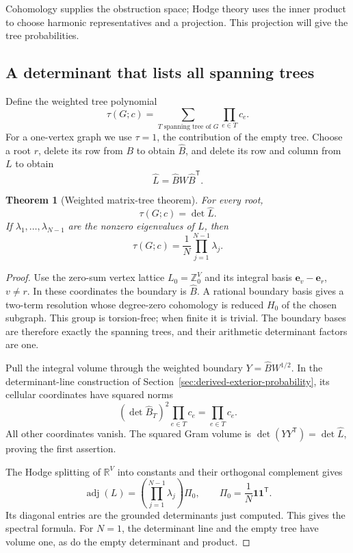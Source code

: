 \documentclass[11pt]{article}
\newtheorem{theorem}{Theorem}[section]
\theoremstyle{definition}
\theoremstyle{remark}
\newcommand{\Z}{\mathbb Z}
\newcommand{\R}{\mathbb R}
\begin{document}
Cohomology supplies the obstruction space; Hodge theory uses the inner product to choose harmonic representatives and a projection. This projection will give the tree probabilities.

\subsection{A determinant that lists all spanning trees}

Define the weighted tree polynomial
\[
 \tau(G;c)=\sum_{T\text{ spanning tree of }G}\prod_{e\in T}c_e.
\]
For a one-vertex graph we use $\tau=1$, the contribution of the empty tree. Choose a root $r$, delete its row from $B$ to obtain $\widehat B$, and delete its row and column from $L$ to obtain
\[
 \widehat L=\widehat B W\widehat B^{\mathsf T}.
\]

\begin{theorem}[Weighted matrix-tree theorem]\label{thm:glin-matrix-tree}
For every root,
\begin{equation}\label{eq:glin-matrix-tree}
 \tau(G;c)=\det\widehat L.
\end{equation}
If $\lambda_1,\ldots,\lambda_{N-1}$ are the nonzero eigenvalues of $L$, then
\begin{equation}\label{eq:glin-spectral-tree}
 \tau(G;c)=\frac1N\prod_{j=1}^{N-1}\lambda_j.
\end{equation}
\end{theorem}
\begin{proof}
Use the zero-sum vertex lattice $L_0=\Z^V_0$ and its integral basis $\mathbf e_v-\mathbf e_r$, $v\ne r$. In these coordinates the boundary is $\widehat B$. A rational boundary basis gives a two-term resolution whose degree-zero cohomology is reduced $H_0$ of the chosen subgraph. This group is torsion-free; when finite it is trivial. The boundary bases are therefore exactly the spanning trees, and their arithmetic determinant factors are one.

Pull the integral volume through the weighted boundary $Y=\widehat B W^{1/2}$. In the determinant-line construction of Section~\ref{sec:derived-exterior-probability}, its cellular coordinates have squared norms
\[
 (\det\widehat B_T)^2\prod_{e\in T}c_e
 =\prod_{e\in T}c_e.
\]
All other coordinates vanish. The squared Gram volume is $\det(YY^{\mathsf T})=\det\widehat L$, proving the first assertion.

The Hodge splitting of $\R^V$ into constants and their orthogonal complement gives
\[
 \operatorname{adj}(L)=
 \left(\prod_{j=1}^{N-1}\lambda_j\right)\Pi_0,
 \qquad \Pi_0=\frac1N\mathbf1\mathbf1^{\mathsf T}.
\]
Its diagonal entries are the grounded determinants just computed. This gives the spectral formula. For $N=1$, the determinant line and the empty tree have volume one, as do the empty determinant and product.
\end{proof}
\end{document}
